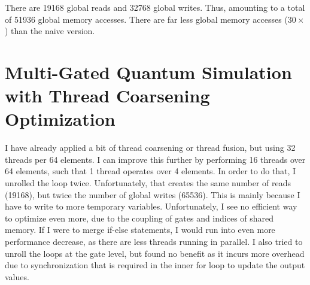 \documentclass{article}
\begin{document}
There are 19168 global reads and 32768 global writes. Thus, amounting to a total of 51936 global memory accesses. There are far less global memory accesses ($30\times$) than the naive version.


\section{Multi-Gated Quantum Simulation with Thread Coarsening Optimization}
I have already applied a bit of thread coarsening or thread fusion, but using 32 threads per 64 elements. I can improve this further by performing 16 threads over 64 elements, such that 1 thread operates over 4 elements. In order to do that, I unrolled the loop twice. Unfortunately, that creates the same number of reads (19168), but twice the number of global writes (65536). This is mainly because I have to write to more temporary variables. Unfortunately, I see no efficient way to optimize even more, due to the coupling of gates and indices of shared memory. If I were to merge if-else statements, I would run into even more performance decrease, as there are less threads running in parallel. I also tried to unroll the loops at the gate level, but found no benefit as it incurs more overhead due to synchronization that is required in the inner for loop to update the output values.
\end{document}
